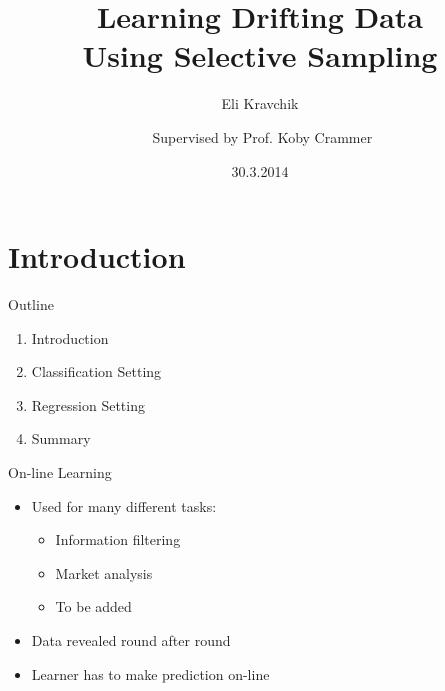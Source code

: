 \documentclass{beamer}
\title{Learning Drifting Data \\Using Selective Sampling}    %
\author {Eli Kravchik \and \newline\newline  $ $ Supervised by Prof. Koby Crammer\newline\newline
}
\institute{Faculty of Electrical Engineering, Technion\\
Israel Institute of Technology}
\date{30.3.2014}
\begin{document}
\maketitle
\section{Introduction}

\begin{frame}{Outline}
\begin{enumerate}
\item Introduction\newline
\item Classification Setting\newline
\item Regression Setting\newline
\item Summary
\end{enumerate}
\end{frame}


\begin{frame}{On-line Learning}
\begin{itemize}
\item Used for many different tasks:\newline
\begin{itemize}
\item Information filtering\newline
\item Market analysis\newline
\item To be added\newline
\end{itemize}
\item Data revealed round after round\newline
\item Learner has to make prediction on-line
\end{itemize}
\end{frame}
\end{document}
